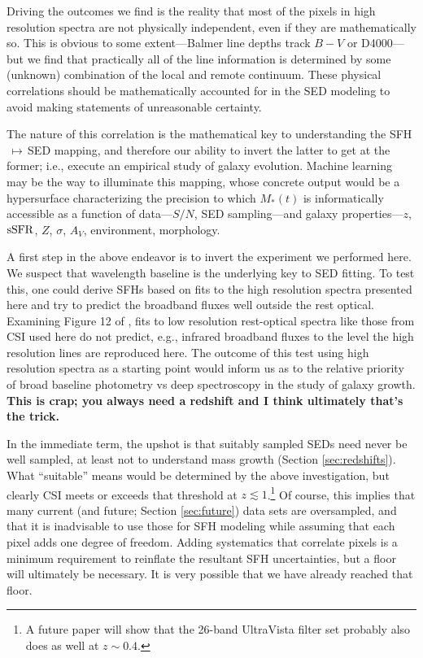 \documentclass[a4paper,fleqn,usenatbib]{mnras}
\newcommand{\Mstel}{M_\ast}
\newcommand{\bfr}{\bf\color{red}}
\newcommand{\ssfr}{{\rm sSFR}}
\begin{document}
Driving the outcomes we find is the reality that most of the pixels in high resolution 
spectra are not physically independent, even if they are mathematically so. This is obvious to 
some extent---Balmer line depths track $B-V$ or D4000---but we find that practically all of the 
line information is determined by some (unknown) combination of the local and remote 
continuum. These physical correlations should be mathematically accounted for in the SED 
modeling to avoid making statements of unreasonable certainty.

The nature of this correlation is the mathematical key to understanding the SFH$\,\mapsto\,$SED 
mapping, and therefore our ability to invert the latter to get at the former; i.e., execute an empirical 
study of galaxy evolution. Machine learning may be the way to illuminate this mapping, whose concrete 
output would be a hypersurface characterizing the precision to which $\Mstel(t)$ is informatically 
accessible as a function of data---$S/N$, SED sampling---and galaxy properties---$z$, $\ssfr$, $Z$, 
$\sigma$, $A_{V}$, environment, morphology. 

A first step in the above endeavor is to invert the experiment we performed here. We suspect 
that wavelength baseline is the underlying key to SED fitting. To test this, one could derive
SFHs based on fits to the high resolution spectra presented here and try to predict the broadband
fluxes well outside the rest optical. Examining Figure 12 of \citet{Abramson20}, fits to
low resolution rest-optical spectra like those from CSI used here do not predict, e.g., infrared
broadband fluxes to the level the high resolution lines are reproduced here. The outcome of
this test using high resolution spectra as a starting point would inform us as to the relative
priority of broad baseline photometry vs deep spectroscopy in the study of galaxy growth. 
{\bfr This is crap; you always need a redshift and I think ultimately that's the trick.}

In the immediate term, the upshot is that suitably sampled SEDs need never be well sampled, at least
not to understand mass growth (Section \ref{sec:redshifts}). What ``suitable'' means would be determined 
by the above investigation, but clearly CSI meets or exceeds that threshold at $z\lesssim1$.\footnote{A future 
paper will show that the 26-band UltraVista filter set \citep{Muzzin13} probably also does as well at 
$z\sim0.4$.} Of course, this implies that many current (and future; Section \ref{sec:future}) data sets 
are oversampled, and that it is inadvisable to use those for SFH modeling while assuming that each 
pixel adds one degree of freedom. Adding systematics that correlate pixels is a minimum requirement 
to reinflate the resultant SFH uncertainties, but a floor will ultimately be necessary. It is very possible 
that we have already reached that floor.
\end{document}
